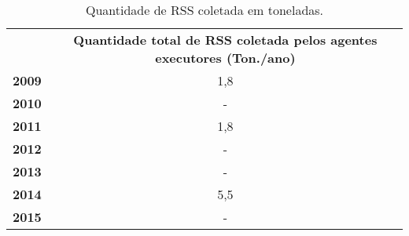 \begin{table}[htbp]
  \centering
  \caption{Quantidade de RSS coletada em toneladas.}
    \begin{tabular}{c|c}
    \rowcolor[rgb]{ .969,  .588,  .275} \multicolumn{1}{p{4.215em}|}{\textcolor[rgb]{ 1,  1,  1}{\textbf{Ano}}} & \multicolumn{1}{p{11.215em}}{\textcolor[rgb]{ 1,  1,  1}{\textbf{Quantidade total de RSS coletada pelos agentes executores (Ton./ano)}}} \\
    \rowcolor[rgb]{ .984,  .831,  .706} \textbf{2009} & 1,8 \\
    \rowcolor[rgb]{ .992,  .914,  .851} \textbf{2010} & - \\
    \rowcolor[rgb]{ .984,  .831,  .706} \textbf{2011} & 1,8 \\
    \rowcolor[rgb]{ .992,  .914,  .851} \textbf{2012} & - \\
    \rowcolor[rgb]{ .984,  .831,  .706} \textbf{2013} & - \\
    \rowcolor[rgb]{ .992,  .914,  .851} \textbf{2014} & 5,5 \\
    \rowcolor[rgb]{ .984,  .831,  .706} \textbf{2015} & - \\
    \end{tabular}%
  \label{tab:quantidade_rss}%
\end{table}%
